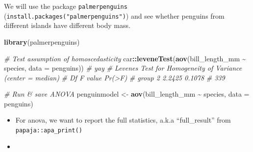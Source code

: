 \documentclass[
]{book}
\newenvironment{Shaded}{\begin{snugshade}}{\end{snugshade}}
\newcommand{\AttributeTok}[1]{\textcolor[rgb]{0.13,0.29,0.53}{#1}}
\newcommand{\CommentTok}[1]{\textcolor[rgb]{0.56,0.35,0.01}{\textit{#1}}}
\newcommand{\FunctionTok}[1]{\textcolor[rgb]{0.13,0.29,0.53}{\textbf{#1}}}
\newcommand{\NormalTok}[1]{#1}
\newcommand{\OtherTok}[1]{\textcolor[rgb]{0.56,0.35,0.01}{#1}}
\newcommand{\SpecialCharTok}[1]{\textcolor[rgb]{0.81,0.36,0.00}{\textbf{#1}}}
\begin{document}
We will use the package \texttt{palmerpenguins} (\texttt{install.packages("palmerpenguins")}) and see whether penguins from different islands have different body mass.

\begin{Shaded}
\begin{Highlighting}[]
\FunctionTok{library}\NormalTok{(palmerpenguins)}

\CommentTok{\# Test assumption of homoscedasticity}
\NormalTok{car}\SpecialCharTok{::}\FunctionTok{leveneTest}\NormalTok{(}\FunctionTok{aov}\NormalTok{(bill\_length\_mm }\SpecialCharTok{\textasciitilde{}}\NormalTok{ species, }\AttributeTok{data =}\NormalTok{ penguins)) }\CommentTok{\# yay}
\CommentTok{\# Levene\textquotesingle{}s Test for Homogeneity of Variance (center = median)}
\CommentTok{\#        Df F value Pr(\textgreater{}F)}
\CommentTok{\# group   2  2.2425 0.1078}
\CommentTok{\#       339}
\end{Highlighting}
\end{Shaded}

\begin{Shaded}
\begin{Highlighting}[]
\CommentTok{\# Run \& save ANOVA}
\NormalTok{penguinmodel }\OtherTok{\textless{}{-}} \FunctionTok{aov}\NormalTok{(bill\_length\_mm }\SpecialCharTok{\textasciitilde{}}\NormalTok{ species, }\AttributeTok{data =}\NormalTok{ penguins)}
\end{Highlighting}
\end{Shaded}

\begin{Shaded}
\end{Shaded}

\begin{itemize}
\item
  For anova, we want to report the full statistics, a.k.a ``full\_result'' from \texttt{papaja::apa\_print()}
\item
\begin{Shaded}
\end{Shaded}
\end{itemize}
\end{document}
